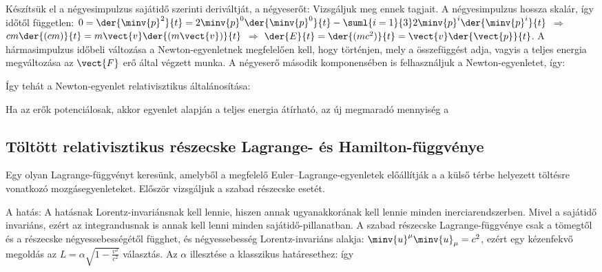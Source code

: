   Készítsük el a négyesimpulzus sajátidő szerinti deriváltját, a négyeserőt:
   Vizsgáljuk meg ennek tagjait.
   A négyesimpulzus hossza skalár, így időtől független: $0=\der{\minv{p}^2}{t}=2\minv{p}^0\der{\minv{p}^0}{t}-\suml{i=1}{3}2\minv{p}^i\der{\minv{p}^i}{t}$ $\Rightarrow$ $cm\der{(cm)}{t}=m\vect{v}\der{(m\vect{v})}{t}$ $\Rightarrow$ $\der{E}{t}=\der{(mc^2)}{t}=\vect{v}\der{\vect{p}}{t}$.
   A hármasimpulzus időbeli változása a Newton-egyenletnek megfelelően kell, hogy történjen, mely a 
   összefüggést adja, vagyis a teljes energia megváltozása az $\vect{F}$ erő által végzett munka.
   A négyeserő második komponensében is felhasználjuk a Newton-egyenletet, így:
   
   Így tehát a Newton-egyenlet relativisztikus általánosítása:
   
   Ha az erők potenciálosak, akkor  egyenlet alapján a teljes energia átírható, az új megmaradó mennyiség a 
  
  \subsection{Töltött relativisztikus részecske Lagrange- és Hamilton-függvénye}\label{ss:02-relqLagrangeHamilton}
   
   Egy olyan Lagrange-függvényt keresünk, amelyből a megfelelő Euler--Lagrange-egyenletek előállítják a a külső térbe helyezett töltésre vonatkozó mozgásegyenleteket.
   Először vizsgáljuk a szabad részecske esetét. 
   
   A hatás:
   A hatásnak Lorentz-invariánsnak kell lennie, hiszen annak ugyanakkorának kell lennie minden inerciarendszerben.
   Mivel a sajátidő invariáns, ezért az integrandusnak is annak kell lenni minden sajátidő-pillanatban.
   A szabad részecske Lagrange-függvénye csak a tömegtől és a részecske négyessebességétől függhet, és négyessebesség Lorentz-invariáns alakja: $\minv{u}^\mu\minv{u}_\mu=c^2$, ezért egy kézenfekvő megoldás az $L=\alpha\sqrt{1-\frac{v^2}{c^2}}$ választás.
   Az $\alpha$ illesztése a klasszikus határesethez:
   így
   
